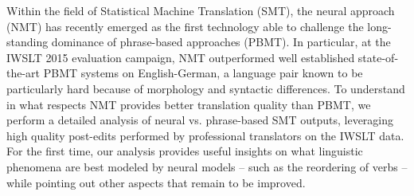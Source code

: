 Within the field of Statistical Machine Translation (SMT), the neural approach (NMT) has recently emerged as the first technology able to challenge the long-standing dominance of phrase-based approaches (PBMT). In particular, at the IWSLT 2015 evaluation campaign, NMT outperformed well established state-of-the-art PBMT systems on English-German, a language pair known to be particularly hard because of morphology and syntactic differences.  To understand in what respects NMT provides better translation quality than PBMT, we perform a detailed analysis of neural vs. phrase-based SMT outputs, leveraging high quality post-edits performed by professional translators on the IWSLT data. For the first time, our analysis provides useful insights on what linguistic phenomena are best modeled by neural models -- such as the reordering of verbs -- while pointing out other aspects that remain to be improved.
